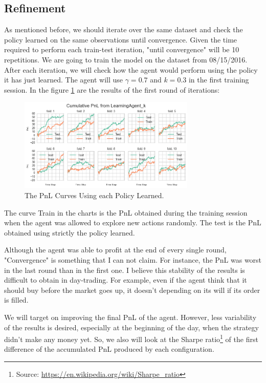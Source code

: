 \documentclass[a4paper]{article}
\begin{document}
\subsection{Refinement}
As mentioned before, we should iterate over the same dataset and check the policy learned on the same observations until convergence. Given the time required to perform each train-test iteration, "until convergence" will be 10 repetitions. We are going to train the model on the dataset from 08/15/2016. After each iteration, we will check how the agent would perform using the policy it has just learned. The agent will use $\gamma=0.7$ and $k=0.3$ in the first training session. In the figure \ref{fig:policy_test_1} are the results of the first round of iterations:

\begin{figure}[ht]
\centering
\includegraphics[width=0.75\textwidth]{figures/policy_tests_1.png}
\caption{\label{fig:policy_test_1}The PnL Curves Using each Policy Learned.}
\end{figure}

The curve Train in the charts is the PnL obtained during the training session when the agent was allowed to explore new actions randomly. The test is the PnL obtained using strictly the policy learned.

Although the agent was able to profit at the end of every single round,  "Convergence" is something that I can not claim. For instance, the PnL was worst in the last round than in the first one. I believe this stability of the results is difficult to obtain in day-trading. For example, even if the agent think that it should buy before the market goes up, it doesn't depending on its will if its order is filled.

We will target on improving the final PnL of the agent. However, less variability of the results is desired, especially at the beginning of the day, when the strategy didn't make any money yet. So, we also will look at the Sharpe ratio\footnote{Source: \url{https://en.wikipedia.org/wiki/Sharpe_ratio}} of the first difference of the accumulated PnL produced by each configuration.
\end{document}
